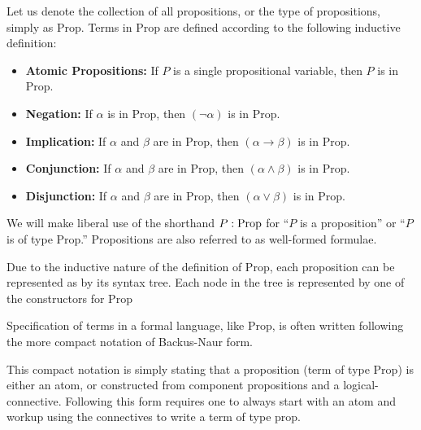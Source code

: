 \documentclass{book}
\begin{document}



Let us denote the collection of all propositions, or the type of propositions, simply as Prop. Terms in Prop are defined according to the following inductive definition: 

\begin{itemize}
    \item {\bf Atomic Propositions:} If $P$ is a single propositional variable, then $P$ is in Prop.
    \item {\bf Negation:} If $\alpha$ is in Prop, then $(\lnot\alpha)$ is in Prop. 
    \item {\bf Implication:} If $\alpha$ and $\beta$ are in Prop, then $(\alpha \to \beta)$ is in Prop.
    \item {\bf Conjunction:} If $\alpha$ and $\beta$ are in Prop, then $(\alpha \land \beta)$ is in Prop.
    \item {\bf Disjunction:} If $\alpha$ and $\beta$ are in Prop, then $(\alpha \lor \beta)$ is in Prop. 		
\end{itemize}

We will make liberal use of the shorthand $P : \text{Prop}$ for ``$P$ is a proposition'' or ``$P$ is of type Prop.'' Propositions are also referred to as well-formed formulae. 

Due to the inductive nature of the definition of Prop, each proposition can be represented as by its syntax tree. Each node in the tree is represented by one of the constructors for Prop



Specification of terms in a formal language, like Prop, is often written following the more compact notation of Backus-Naur form. 


This compact notation is simply stating that a proposition (term of type Prop) is either an atom, or constructed from component propositions and a logical-connective. Following this form requires one to always start with an atom and workup using the connectives to write a term of type prop. 
\end{document}
